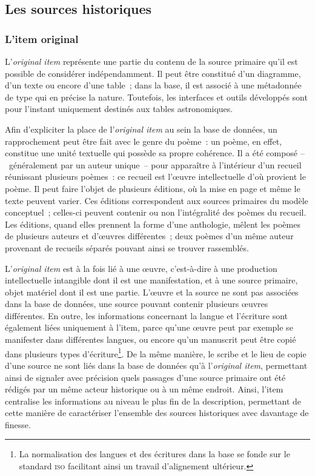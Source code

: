 \documentclass[a4paper,12pt,twoside]{book}
\newcommand{\eng}{\emph}
\newcommand{\oi}{\eng{original item}\xspace}
\begin{document}
		\subsection{Les sources historiques}
			\subsubsection{L'item original}
L'\oi représente une partie du contenu de la source primaire qu'il est possible de considérer indépendamment. Il peut être constitué d'un diagramme, d'un texte ou encore d'une table~; dans la base, il est associé à une métadonnée de type qui en précise la nature. Toutefois, les interfaces et outils développés sont pour l'instant uniquement destinés aux tables astronomiques.

Afin d'expliciter la place de l'\oi au sein la base de données, un rapprochement peut être fait avec le genre du poème~: un poème, en effet, constitue une unité textuelle qui possède sa propre cohérence. Il a été composé –~généralement par un auteur unique~– pour apparaître à l'intérieur d'un recueil réunissant plusieurs poèmes~: ce recueil est l'œuvre intellectuelle d'où provient le poème. Il peut faire l'objet de plusieurs éditions, où la mise en page et même le texte peuvent varier. Ces éditions correspondent aux sources primaires du modèle conceptuel~; celles-ci peuvent contenir ou non l'intégralité des poèmes du recueil. Les éditions, quand elles prennent la forme d'une anthologie, mêlent les poèmes de plusieurs auteurs et d'œuvres différentes~; deux poèmes d'un même auteur provenant de recueils séparés pouvant ainsi se trouver rassemblés.

L'\oi est à la fois lié à une œuvre, c'est-à-dire à une production intellectuelle intangible dont il est une manifestation, et à une source primaire, objet matériel dont il est une partie. L'œuvre et la source ne sont pas associées dans la base de données, une source pouvant contenir plusieurs œuvres différentes. En outre, les informations concernant la langue et l'écriture sont également liées uniquement à l'item, parce qu'une œuvre peut par exemple se manifester dans différentes langues, ou encore qu'un manuscrit peut être copié dans plusieurs types d'écriture\footnote{La normalisation des langues et des écritures dans la base se fonde sur le standard \textsc{iso} facilitant ainsi un travail d'alignement ultérieur.}. De la même manière, le scribe et le lieu de copie d'une source ne sont liés dans la base de données qu'à l'\oi, permettant ainsi de signaler avec précision quels passages d'une source primaire ont été rédigés par un même acteur historique ou à un même endroit. Ainsi, l'item centralise les informations au niveau le plus fin de la description, permettant de cette manière de caractériser l'ensemble des sources historiques avec davantage de finesse.
\end{document}
